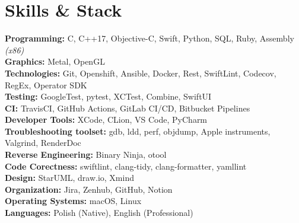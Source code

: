 \documentclass[letterpaper,11pt]{article}
\newcommand{\resumeSubHeadingListStart}{\begin{itemize}[leftmargin=0.15in, label={}]}
\newcommand{\resumeSubHeadingListEnd}{\end{itemize}}
\begin{document}
\section{Skills \& Stack}
 \vspace{2pt}
 \resumeSubHeadingListStart
 \small{\item{
 \textbf{Programming: }{C, C++17, Objective-C, Swift, Python, SQL, Ruby, Assembly \textit{(x86)}} \\ \vspace{3pt}
 \textbf{Graphics: }{Metal, OpenGL} \\ \vspace{3pt}
 \textbf{Technologies: }{Git, Openshift, Ansible, Docker, Rest, SwiftLint, Codecov, RegEx, Operator SDK} \\ \vspace{3pt}
 \textbf{Testing: }{GoogleTest, pytest, XCTest, Combine, SwiftUI} \\ \vspace{3pt}
 \textbf{CI: }{TravisCI, GitHub Actions, GitLab CI/CD, Bitbucket Pipelines} \\ \vspace{3pt}
 \textbf{Developer Tools: }{XCode, CLion, VS Code, PyCharm} \\ \vspace{3pt}
 \textbf{Troubleshooting toolset: }{gdb, ldd, perf, objdump, Apple instruments, Valgrind, RenderDoc} \\ \vspace{3pt}
 \textbf{Reverse Engineering: }{Binary Ninja, otool} \\ \vspace{3pt}
 \textbf{Code Corectness: }{swiftlint, clang-tidy, clang-formatter, yamllint} \\ \vspace{3pt}
 \textbf{Design: }{StarUML, draw.io, Xmind} \\ \vspace{3pt}
 \textbf{Organization: }{Jira, Zenhub, GitHub, Notion} \\ \vspace{3pt}
 \textbf{Operating Systems: }{macOS, Linux} \\ \vspace{3pt}
 \textbf{Languages: }{Polish (Native), English (Professional) } \\
 }}
 \resumeSubHeadingListEnd


 
\end{document}
